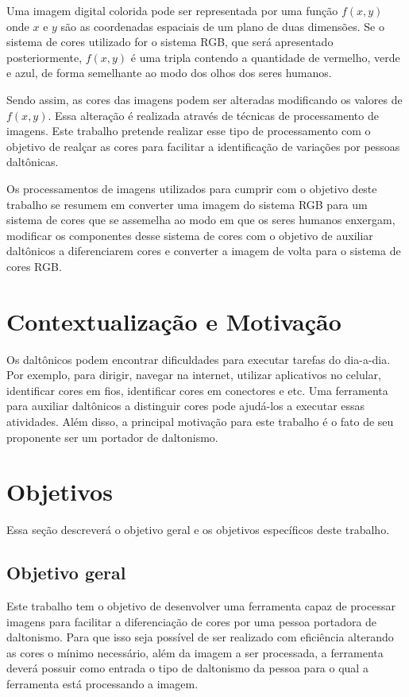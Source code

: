 \documentclass[	12pt, Times, openright, twoside, a4paper, english, brazil]{abntex2}
\begin{document}
Uma imagem digital colorida pode ser representada por uma função $f(x, y)$ onde $x$ e $y$ são as coordenadas espaciais de um plano de duas dimensões. Se o sistema de cores utilizado for o sistema RGB, que será apresentado posteriormente, $f(x, y)$ é uma tripla contendo a quantidade de vermelho, verde e azul, de forma semelhante ao modo dos olhos dos seres humanos.

Sendo assim, as cores das imagens podem ser alteradas modificando os valores de $f(x, y)$. Essa alteração é realizada através de técnicas de processamento de imagens. Este trabalho pretende realizar esse tipo de processamento com o objetivo de realçar as cores para facilitar a identificação de variações por pessoas daltônicas.

Os processamentos de imagens utilizados para cumprir com o objetivo deste trabalho se resumem em converter uma imagem do sistema RGB para um sistema de cores que se assemelha ao modo em que os seres humanos enxergam, modificar os componentes desse sistema de cores com o objetivo de auxiliar daltônicos a diferenciarem cores e converter a imagem de volta para o sistema de cores RGB.

\section{Contextualização e Motivação}
Os daltônicos podem encontrar dificuldades para executar tarefas do dia-a-dia. Por exemplo, para dirigir, navegar na internet, utilizar aplicativos no celular, identificar cores em fios, identificar cores em conectores e etc. Uma ferramenta para auxiliar daltônicos a distinguir cores pode ajudá-los a executar essas atividades. Além disso, a principal motivação para este trabalho é o fato de seu proponente ser um portador de daltonismo.

\section{Objetivos}
Essa seção descreverá o objetivo geral e os objetivos específicos deste trabalho.

\subsection{Objetivo geral}

Este trabalho tem o objetivo de desenvolver uma ferramenta capaz de processar imagens para facilitar a diferenciação de cores por uma pessoa portadora de daltonismo. Para que isso seja possível de ser realizado com eficiência alterando as cores o mínimo necessário, além da imagem a ser processada, a ferramenta deverá possuir como entrada o tipo de daltonismo da pessoa para o qual a ferramenta está processando a imagem.
\end{document}
